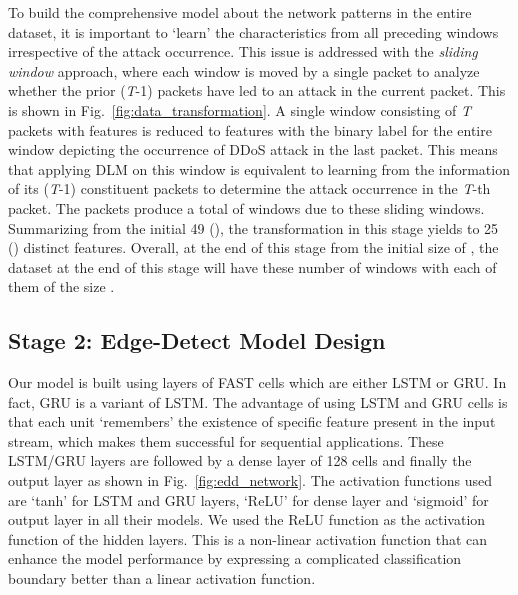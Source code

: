 \documentclass[conference]{IEEEtran}
\begin{document}
To build the comprehensive model about the network patterns in the entire dataset, it is important to  `learn' the characteristics from all preceding windows irrespective of the attack occurrence. 
This issue is addressed with the \textit{sliding window} approach, where each window is moved by a single packet to analyze whether the prior (\textit{T}-1) packets have led to an attack in the current packet.
This is shown in Fig.~\ref{fig:data_transformation}. 
A single window consisting of \textit{T} packets with  features is reduced to   features with the binary label for the entire window depicting the occurrence of DDoS attack in the last packet. 
This means that applying DLM on this window is equivalent to learning from the information of its (\textit{T}-1) constituent packets to determine the attack occurrence in the \textit{T}-th packet. 
The  packets produce a total of  windows due to these sliding windows.
Summarizing from the initial 49 (), the transformation in this stage yields to 25 () distinct features. 
Overall, at the end of this stage from the initial size of , the dataset at the end of this stage will have these  number of windows with each of them of the size . 

\subsection{Stage 2: Edge-Detect Model Design} \label{Sec:model_design}
\noindent   
Our model is built using layers of FAST cells which are either LSTM  or GRU. In fact, GRU is a variant of LSTM.
The advantage of using LSTM and GRU cells is that each unit `remembers' the existence of specific feature present in the input stream, which makes them successful for sequential applications. 
These LSTM/GRU layers are followed by a dense layer of 128 cells and finally the output layer as shown in Fig.~\ref{fig:edd_network}. 
The activation functions used are `tanh' for LSTM and GRU layers, `ReLU' for dense layer and `sigmoid' for output layer in all their models. 
We used the ReLU function as the activation function of the hidden layers. This is a non-linear activation function that can enhance the model performance by expressing a complicated classification boundary better than a linear activation function.
\end{document}
